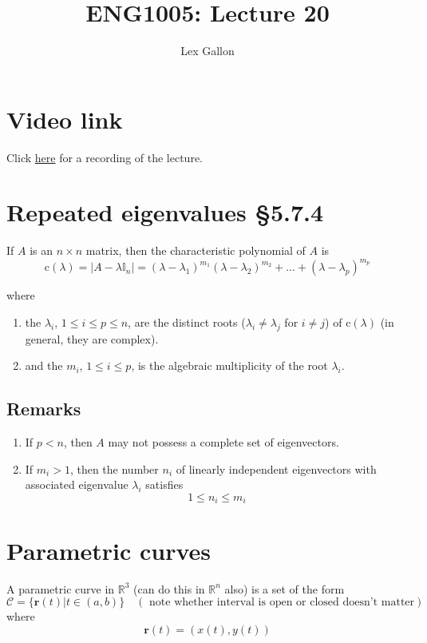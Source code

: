\documentclass[11pt]{article}
\newcommand{\reals}{\mathbb{R}}
\newcommand{\ident}{\mathbb{I}}
\renewcommand{\vec}[1]{\mathbf{#1}}
\begin{document}
\title{ENG1005: Lecture 20}
\author{Lex Gallon}
\maketitle

\tableofcontents

\section*{Video link}
Click \href{https://echo360.org.au/lesson/G_32340f5d-ff38-43d2-be9d-d88ddb1b3611_b944cecf-8ba5-40d3-a870-0243a0a9e78c_2020-05-06T14:58:00.000_2020-05-06T15:53:00.000/classroom#sortDirection=desc}{here} for a recording of the lecture.

\section{Repeated eigenvalues §5.7.4}
If $A$ is an $n \times n$ matrix, then the characteristic polynomial of $A$ is 
\[ \text{c}(\lambda) = |A - \lambda \ident_n| = (\lambda - \lambda_1)^{m_1} (\lambda - \lambda_2)^{m_2} + ... + (\lambda - \lambda_p)^{m_p}\]

where
\begin{enumerate}[ (i) ]
\item the $\lambda_i$, $1 \leq i \leq p \leq n$, are the distinct roots ($\lambda_i \not = \lambda_j$ for $i \not = j$) of $\text{c}(\lambda)$ (in general, they are complex).
\item and the $m_i$, $1 \leq i \leq p$, is the algebraic multiplicity of the root $\lambda_i$.
\end{enumerate}

\subsection{Remarks}
\begin{enumerate}[ (a) ]
\item If $p < n$, then $A$ may not possess a complete set of eigenvectors.
\item If $m_i > 1$, then the number $n_i$ of linearly independent eigenvectors with associated eigenvalue $\lambda_i$ satisfies
\[ 1 \leq n_i \leq m_i \]
\end{enumerate}

\section{Parametric curves}
A parametric curve in $\reals^3$ (can do this in $\reals^n$ also) is a set of the form
\[ \mathcal{C} = \{ \vec{r}(t) | t \in (a, b) \} \quad (\text{ note whether interval is open or closed doesn't matter})\]
where
\[ \vec{r}(t) = (x(t), y(t)) \]
\end{document}
